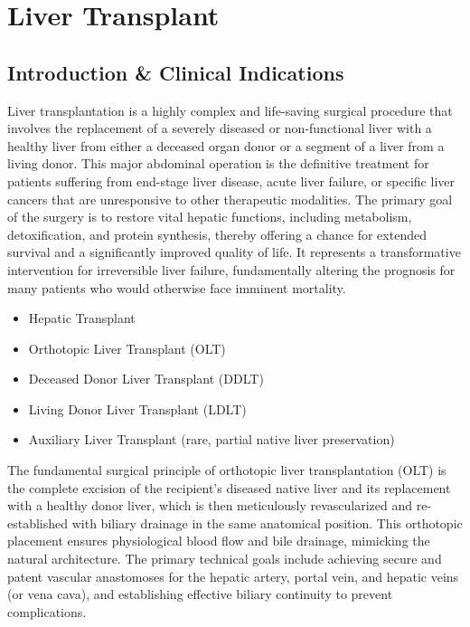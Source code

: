 \chapter{Liver Transplant}

\section*{Introduction \& Clinical Indications}
Liver transplantation is a highly complex and life-saving surgical procedure that involves the replacement of a severely diseased or non-functional liver with a healthy liver from either a deceased organ donor or a segment of a liver from a living donor. This major abdominal operation is the definitive treatment for patients suffering from end-stage liver disease, acute liver failure, or specific liver cancers that are unresponsive to other therapeutic modalities. The primary goal of the surgery is to restore vital hepatic functions, including metabolism, detoxification, and protein synthesis, thereby offering a chance for extended survival and a significantly improved quality of life. It represents a transformative intervention for irreversible liver failure, fundamentally altering the prognosis for many patients who would otherwise face imminent mortality.

\begin{itemize}
  \item Hepatic Transplant
  \item Orthotopic Liver Transplant (OLT)
  \item Deceased Donor Liver Transplant (DDLT)
  \item Living Donor Liver Transplant (LDLT)
  \item Auxiliary Liver Transplant (rare, partial native liver preservation)
\end{itemize}

The fundamental surgical principle of orthotopic liver transplantation (OLT) is the complete excision of the recipient's diseased native liver and its replacement with a healthy donor liver, which is then meticulously revascularized and re-established with biliary drainage in the same anatomical position. This orthotopic placement ensures physiological blood flow and bile drainage, mimicking the natural architecture. The primary technical goals include achieving secure and patent vascular anastomoses for the hepatic artery, portal vein, and hepatic veins (or vena cava), and establishing effective biliary continuity to prevent complications.

